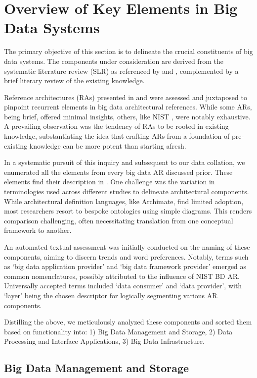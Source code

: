 \documentclass[conference]{IEEEtran}
\begin{document}
\section{Overview of Key Elements in Big Data Systems}

The primary objective of this section is to delineate the crucial constituents of big data systems. The components under consideration are derived from the systematic literature review (SLR) as referenced by \cite{b1} and \cite{b2}, complemented by a brief literary review of the existing knowledge.

Reference architectures (RAs) presented in \cite{b1} and \cite{b2} were assessed and juxtaposed to pinpoint recurrent elements in big data architectural references. While some ARs, being brief, offered minimal insights, others, like NIST \cite{b3}, were notably exhaustive. A prevailing observation was the tendency of RAs to be rooted in existing knowledge, substantiating the idea that crafting ARs from a foundation of pre-existing knowledge can be more potent than starting afresh.

In a systematic pursuit of this inquiry and subsequent to our data collation, we enumerated all the elements from every big data AR discussed prior. These elements find their description in \cite{b2}. One challenge was the variation in terminologies used across different studies to delineate architectural components. While architectural definition languages, like Archimate, find limited adoption, most researchers resort to bespoke ontologies using simple diagrams. This renders comparison challenging, often necessitating translation from one conceptual framework to another.

An automated textual assessment was initially conducted on the naming of these components, aiming to discern trends and word preferences. Notably, terms such as ‘big data application provider’ and ‘big data framework provider’ emerged as common nomenclatures, possibly attributed to the influence of NIST BD AR. Universally accepted terms included ‘data consumer’ and ‘data provider’, with ‘layer’ being the chosen descriptor for logically segmenting various AR components.

Distilling the above, we meticulously analyzed these components and sorted them based on functionality into: 1) Big Data Management and Storage, 2) Data Processing and Interface Applications, 3) Big Data Infrastructure.

\subsection{Big Data Management and Storage}
\end{document}
